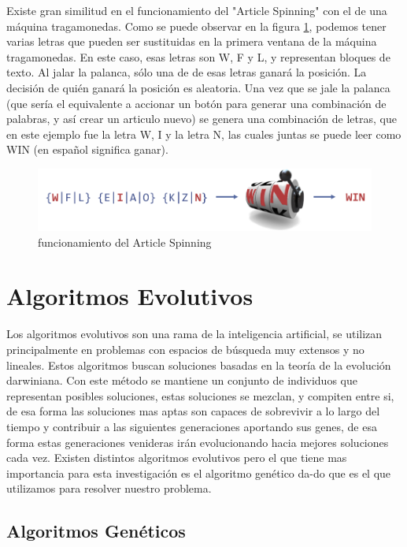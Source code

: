 Existe gran similitud en el funcionamiento del "Article Spinning" con el de una máquina tragamonedas. Como se puede observar en la figura \ref{as}, podemos tener varias letras que pueden ser sustituidas en la primera ventana de la máquina tragamonedas. En este caso, esas letras son W, F y L, y representan bloques de texto. Al jalar la palanca, sólo una de de esas letras ganará la posición. La decisión de quién ganará la posición es aleatoria. Una vez que se jale la palanca (que sería el equivalente a accionar un botón para generar una combinación de palabras, y así crear un articulo nuevo) se genera una combinación de letras, que en este ejemplo fue la letra W, I y la letra N, las cuales juntas se puede leer como WIN (en español significa ganar).


\begin{figure}[htp]
  \centerline{\includegraphics[width=4.5in]{as.png}} 
  \caption{funcionamiento del Article Spinning} 
\label{as}
\end{figure}


\section{Algoritmos Evolutivos}

Los algoritmos evolutivos son una rama de la inteligencia artificial, se utilizan principalmente en problemas con espacios de búsqueda muy extensos y no lineales. Estos algoritmos buscan soluciones basadas en la teoría de la evolución darwiniana. 
Con este método se mantiene un conjunto de individuos que representan posibles soluciones, estas soluciones se mezclan, y compiten entre si, de esa forma las soluciones mas aptas son capaces de sobrevivir a lo largo del tiempo y contribuir a las siguientes generaciones aportando sus genes, de esa forma estas generaciones venideras irán evolucionando hacia mejores soluciones cada vez. Existen distintos algoritmos evolutivos pero el que tiene mas importancia para esta investigación es el algoritmo genético da-do que es el que utilizamos para resolver nuestro problema.\cite{malcolm2008approach}

\subsection{Algoritmos Genéticos}

